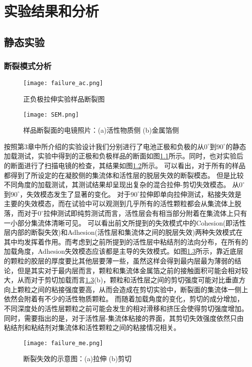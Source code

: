 \chapter{实验结果和分析}
\section{静态实验}
\subsection{断裂模式分析}
\begin{figure}
\centering   
\texttt{[image: failure\_ac.png]}
\caption{正负极拉伸实验样品断裂图} 
\label{fig:ac}
\end{figure}
\begin{figure}
\centering   
\texttt{[image: SEM.png]}
\caption{样品断裂面的电镜照片：(a)活性物质侧 (b)金属箔侧} 
\label{fig:sem}
\end{figure}
按照第3章中所介绍的实验设计我们分别进行了电池正极和负极的从$0^{\circ}$到$90^{\circ}$的静态加载测试，实验中得到的正极和负极样品的断面如图\ref{fig:ac}所示。同时，也对实验后的断面进行了扫描电镜的检查，其结果如图\ref{fig:sem}所示。
可以看出，对于所有的样品都得到了所设定的在凝胶侧的集流体和活性层的脱层失效的断裂模态。 但是比较不同角度的加载测试，其测试结果却呈现出复杂的混合拉伸-剪切失效模态。 从$0^{\circ}$到$90^{\circ}$，失效模态发生了显著的变化。 对于$90^{\circ}$拉伸即单向拉伸测试，粘接失效是主要的失效模态，而在试验中可以观测到几乎所有的活性颗粒都会从集流体上脱落，而对于$0^{\circ}$拉伸测试即纯剪测试而言，活性层会有相当部分附着在集流体上只有一小部分集流体清晰可见。 可以看出前文所提到的失效模式中的Cohesion(即活性层内部的断裂失效)和Adhesion(活性层和集流体之间的脱层失效)两种失效模式在其中均发挥着作用。而考虑到之前所提到的活性层中粘结剂的法向分布\cite{M2017Investigation}，在所有的加载角度，Adhesion失效模态应该都是主导的失效模式。如图\ref{fig:mech}所示，靠近底层的颗粒的胶层的厚度要比其他层要薄一些，虽然这样会得到最内层最为薄弱的结论，但是其实对于最内层而言，颗粒和集流体金属箔之前的接触面积可能会相对较大，从而对于剪切加载而言\ref{fig:mech}(b)，颗粒和活性层之间的剪切强度可能对比垂直方向上颗粒之间的粘接强度要高，从而会造成在剪切实验中，断裂面的集流体一侧上依然会附着有不少的活性物质颗粒。 而随着加载角度的变化，剪切的成分增加，不同深度处的活性层颗粒之前可能会发生的相对滑移和挤压会使得剪切强度增加。 同时，需要指出的是，对于活性层-集流体粘接的界面，其剪切失效强度依然只由粘结剂和粘结剂对集流体和活性颗粒之间的粘接情况相关。
\begin{figure}
\centering   
\texttt{[image: failure\_me.png]}
\caption{断裂失效的示意图：(a)拉伸 (b)剪切} 
\label{fig:mech}
\end{figure}

